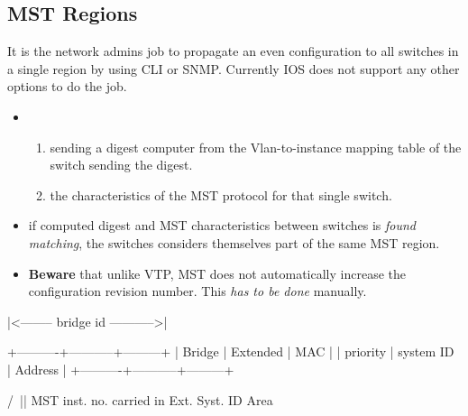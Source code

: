 \subsection{MST Regions}

It is the network admins job to propagate an even configuration to all switches in a single region by using CLI or SNMP. Currently IOS does not support any other options to do the job.

\begin{itemize}
    \item {}
    \begin{enumerate}
        \item sending a digest computer from the Vlan-to-instance mapping table of the switch sending the digest.
        \item the characteristics of the MST protocol for that single switch.
    \end{enumerate}
    \item if computed digest and MST characteristics between switches is \textit{found matching}, the switches considers themselves part of the same MST region.
    \item \textbf{Beware} that unlike VTP, MST does not automatically increase the configuration revision number. This \textit{has to be done} manually.
\end{itemize}



\begin{txt}
|<-------- bridge id ----------->|

+----------+-----------+---------+
| Bridge   | Extended  | MAC     |
| priority | system ID | Address |
+----------+-----------+---------+

                /\
                ||
    MST inst. no. carried in
      Ext. Syst. ID Area
\end{txt}
